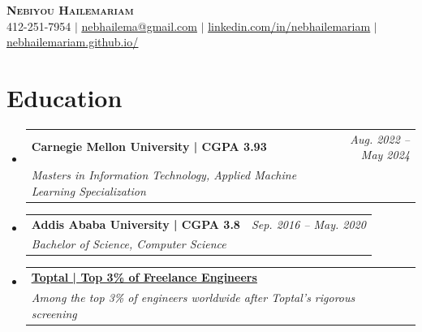 \documentclass[letterpaper,11pt]{article}
\makeatletter
\newcommand{\resumeSubheading}[4]{
  \vspace{-2pt}\item
    \begin{tabular*}{0.97\textwidth}[t]{l@{\extracolsep{\fill}}r}
      \textbf{#1} & \textit{#2} \\
      \textit{\small#3} & \textit{\small #4} \\
    \end{tabular*}\vspace{-7pt}
}
\newcommand{\resumeSubHeadingListStart}{\begin{itemize}[leftmargin=0.15in, label={}]}
\newcommand{\resumeSubHeadingListEnd}{\end{itemize}}
\newcommand{\resumeLink}[2]{\underline{\textcolor{blue}{\href{#1}{#2}}}}
\makeatother
\begin{document}

\begin{center}
    \textbf{\Huge \scshape Nebiyou Hailemariam} \\ \vspace{1pt}
    \small 412-251-7954 $|$ \resumeLink{mailto:nebhailema@gmail.com}{nebhailema@gmail.com} $|$ 
    \resumeLink{https://linkedin.com/in/nebhailemariam/}{linkedin.com/in/nebhailemariam}
    $|$ 
    \resumeLink{https://nebhailemariam.github.io/}{nebhailemariam.github.io/}
\end{center}
  
\section{Education}
  \resumeSubHeadingListStart
    \resumeSubheading
      {Carnegie Mellon University | CGPA 3.93}{Aug. 2022 -- May 2024}
      {Masters in Information Technology, Applied Machine
Learning Specialization}{}
    \resumeSubheading
      {Addis Ababa University | CGPA 3.8}{Sep. 2016 -- May. 2020}
      {Bachelor of Science, Computer Science}{}
    \resumeSubheading
      {\resumeLink{https://www.toptal.com/}{Toptal | Top 3\% of Freelance Engineers}}{}
      {Among the top 3\% of engineers worldwide after Toptal's rigorous screening}{}
  \resumeSubHeadingListEnd


\end{document}
